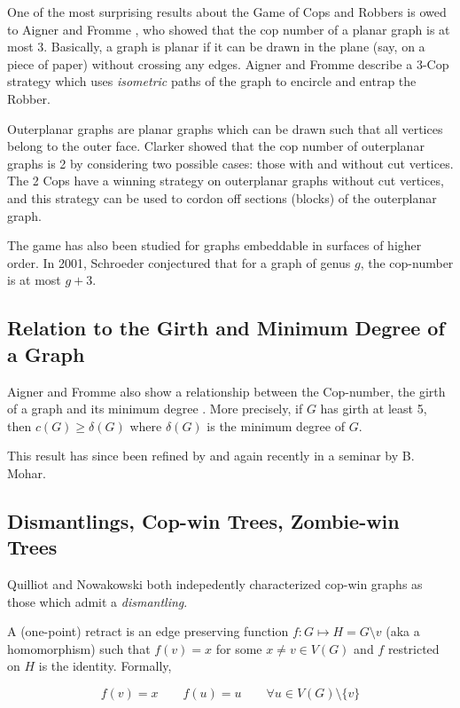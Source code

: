 One of the most surprising results about the Game of Cops and Robbers is owed to Aigner and Fromme \cite{aigner1984game}, who showed that the cop number of a planar graph is at most 3.
Basically, a graph is planar if it can be drawn in the plane (say, on a piece of paper) without crossing any edges. Aigner and Fromme describe a 3-Cop strategy which uses \textit{isometric} paths of the graph to encircle and entrap the Robber.

Outerplanar graphs are planar graphs which can be drawn such that all vertices belong to the outer face. Clarker \cite{clarke2002constrained} showed that the cop number of outerplanar graphs is 2 by considering
two possible cases: those with and without cut vertices. The 2 Cops have a winning strategy on outerplanar graphs without cut vertices, and this strategy can be used to cordon off sections (blocks)
of the outerplanar graph.

The game has also been studied for graphs embeddable in surfaces of higher order.
In 2001, Schroeder conjectured \cite{bonato2017topological} that for a graph of genus $g$,
the cop-number is at most $g+3$.

\subsection{Relation to the Girth and Minimum Degree of a Graph}

Aigner and Fromme also show a relationship between the Cop-number, the girth of a graph and
its minimum degree \cite{aigner1984game}. More precisely, if $G$ has girth at least 5, then $c(G)\geq \delta(G)$ where $\delta(G)$ is the minimum degree of $G$.

This result has since been refined by \cite{frankl1987cops} and again recently in a
seminar by B. Mohar.

\subsection{Dismantlings, Cop-win Trees, Zombie-win Trees}

Quilliot and Nowakowski both indepedently characterized cop-win graphs as those which
admit a \textit{dismantling}.

A (one-point) retract is an edge preserving function $f : G \mapsto H = G \setminus v$
(aka a homomorphism) such that $f(v) = x$ for some $x \neq v \in V(G)$ and $f$ restricted on $H$ is the identity.
Formally,

\[ f(v) = x \qquad f(u) = u \qquad \forall u \in V(G)\setminus \{ v \} \]

